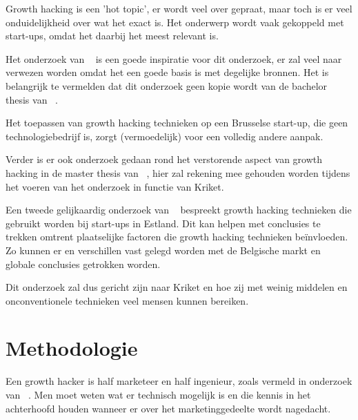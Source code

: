 Growth hacking is een 'hot topic', er wordt veel over gepraat, maar toch is er veel onduidelijkheid over wat het exact is. Het onderwerp wordt vaak gekoppeld met start-ups, omdat het daarbij het meest relevant is.

Het onderzoek van ~\autocite{Lee2016} is een goede inspiratie voor dit onderzoek, er zal veel naar verwezen worden omdat het een goede basis is met degelijke bronnen. Het is belangrijk te vermelden dat dit onderzoek geen kopie wordt van de bachelor thesis van ~\autocite{Lee2016}. 

Het toepassen van growth hacking technieken op een Brusselse start-up, die geen technologiebedrijf is, zorgt (vermoedelijk) voor een volledig andere aanpak. 

Verder is er ook onderzoek gedaan rond het verstorende aspect van growth hacking in de master thesis van ~\autocite{Bergendal2017}, hier zal rekening mee gehouden worden tijdens het voeren van het onderzoek in functie van Kriket.

Een tweede gelijkaardig onderzoek van ~\autocite{Vunk2017} bespreekt growth hacking technieken die gebruikt worden bij start-ups in Estland. Dit kan helpen met conclusies te trekken omtrent plaatselijke factoren die growth hacking technieken beïnvloeden. Zo kunnen er en verschillen vast gelegd worden met de Belgische markt en globale conclusies getrokken worden.

Dit onderzoek zal dus gericht zijn naar Kriket en hoe zij met weinig middelen en onconventionele technieken veel mensen kunnen bereiken.



\section{Methodologie}
\label{sec:methodologie}

Een growth hacker is half marketeer en half ingenieur, zoals vermeld in onderzoek van ~\cite{Lee2016}. Men moet weten wat er technisch mogelijk is en die kennis in het achterhoofd houden wanneer er over het marketinggedeelte wordt nagedacht. 

